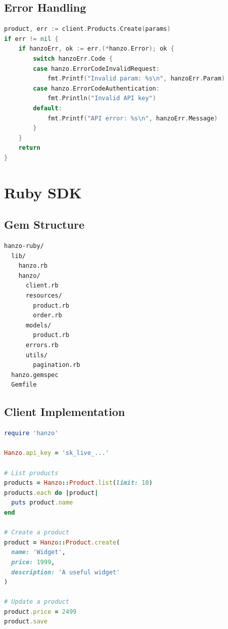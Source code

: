 \documentclass[11pt,a4paper]{article}
\begin{document}
\subsection{Error Handling}

\begin{lstlisting}[language=Go, caption=Go Error Handling]
product, err := client.Products.Create(params)
if err != nil {
    if hanzoErr, ok := err.(*hanzo.Error); ok {
        switch hanzoErr.Code {
        case hanzo.ErrorCodeInvalidRequest:
            fmt.Printf("Invalid param: %s\n", hanzoErr.Param)
        case hanzo.ErrorCodeAuthentication:
            fmt.Println("Invalid API key")
        default:
            fmt.Printf("API error: %s\n", hanzoErr.Message)
        }
    }
    return
}
\end{lstlisting}

\section{Ruby SDK}

\subsection{Gem Structure}

\begin{lstlisting}[caption=Ruby SDK Structure]
hanzo-ruby/
  lib/
    hanzo.rb
    hanzo/
      client.rb
      resources/
        product.rb
        order.rb
      models/
        product.rb
      errors.rb
      utils/
        pagination.rb
  hanzo.gemspec
  Gemfile
\end{lstlisting}

\subsection{Client Implementation}

\begin{lstlisting}[language=Ruby, caption=Ruby Client]
require 'hanzo'

Hanzo.api_key = 'sk_live_...'

# List products
products = Hanzo::Product.list(limit: 10)
products.each do |product|
  puts product.name
end

# Create a product
product = Hanzo::Product.create(
  name: 'Widget',
  price: 1999,
  description: 'A useful widget'
)

# Update a product
product.price = 2499
product.save
\end{lstlisting}
\end{document}
